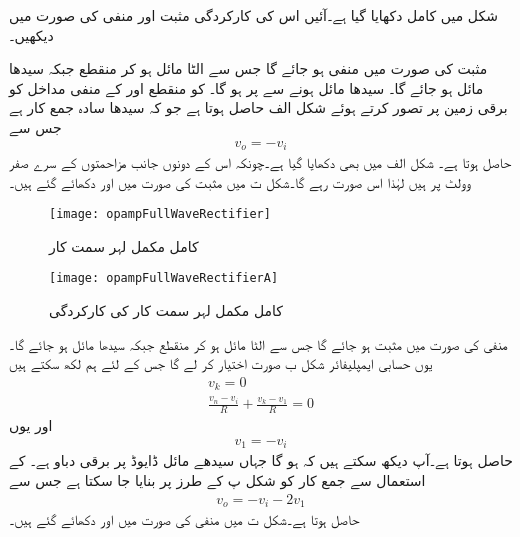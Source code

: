 
شکل  میں کامل  دکھایا گیا ہے۔آئیں اس کی کارکردگی مثبت اور منفی  کی صورت میں دیکھیں۔

مثبت  کی صورت میں  منفی ہو جائے گا جس سے  الٹا مائل ہو کر منقطع جبکہ  سیدھا مائل ہو جائے گا۔ سیدھا مائل ہونے سے   پر   ہو گا۔ کو منقطع اور  کے منفی مداخل کو برقی زمین پر تصور کرتے ہوئے  شکل  الف حاصل ہوتا ہے جو کہ سیدھا سادہ جمع کار ہے جس سے
\begin{align*}
v_o=-v_i
\end{align*}
حاصل ہوتا ہے۔ شکل  الف میں  بھی دکھایا گیا ہے۔چونکہ اس کے دونوں جانب مزاحمتوں کے سرے صفر وولٹ پر ہیں لہٰذا اس صورت  رہے گا۔شکل  ت میں مثبت  کی صورت میں  اور  دکھائے گئے ہیں۔
\begin{figure}
\centering
\texttt{[image: opampFullWaveRectifier]}
\caption{کامل مکمل لہر سمت کار}
\label{شکل_کامل_مکمل_لہر_سمت_کار}
\end{figure}
%
\begin{figure}
\centering
\texttt{[image: opampFullWaveRectifierA]}
\caption{کامل مکمل لہر سمت کار کی کارکردگی}
\label{شکل_کامل_مکمل_لہر_سمت_کار_الف}
\end{figure}

منفی  کی صورت میں  مثبت ہو جائے گا جس سے  الٹا مائل ہو کر منقطع جبکہ  سیدھا مائل ہو جائے گا۔یوں  حسابی ایمپلیفائر شکل  ب صورت اختیار کر لے گا جس کے لئے ہم لکھ سکتے ہیں
\begin{align*}
v_k=0\\
\frac{v_n-v_i}{R}+\frac{v_k-v_1}{R}=0
\end{align*}
اور یوں
\begin{align*}
v_1=-v_i
\end{align*}
حاصل ہوتا ہے۔آپ دیکھ سکتے ہیں کہ  ہو گا جہاں  سیدھے مائل ڈایوڈ  پر برقی دباو ہے۔  کے استعمال سے جمع کار کو شکل  پ کے طرز پر بنایا جا سکتا ہے جس سے
\begin{align*}
v_o=-v_i-2 v_1
\end{align*}
حاصل ہوتا ہے۔شکل  ت میں منفی  کی صورت میں  اور  دکھائے گئے ہیں۔

